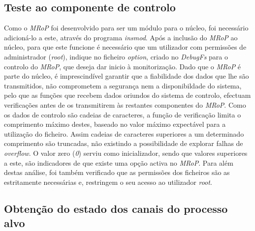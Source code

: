\subsection{Teste ao componente de controlo}

Como o \textit{MRoP} foi desenvolvido para ser um módulo para o núcleo, foi necessário adicioná-lo a este, através do programa \textit{insmod}.
Após a inclusão do \textit{MRoP} ao núcleo, para que este funcione é necessário que um utilizador com permissões de administrador (\textit{root}), indique no ficheiro \textit{option}, criado no \textit{DebugFs} para o controlo do \textit{MRoP}, que deseja dar inicio à monitorização.
Dado que o \textit{MRoP} é parte do núcleo, é imprescindível garantir que a fiabilidade dos dados que lhe são transmitidos, não comprometem a segurança nem a disponibildade do sistema, pelo que as funções que recebem dados oriundos do sistema de controlo, efectuam verificações antes de os transmitirem às restantes componentes do \textit{MRoP}.
Como os dados de controlo são cadeias de caracteres, a função de verificação limita o comprimento máximo destes, baseado no valor máximo expectável para a utilização do ficheiro.
Assim cadeias de caracteres superiores a um determinado comprimento são truncadas, não existindo a possibilidade de explorar falhas de \textit{overflow}.
O valor zero (\textit{0}) serviu como inicializador, sendo que valores superiores a este, são indicadores de que existe uma opção activa no \textit{MRoP}.
Para além destas análise, foi também verificado que as permissões dos ficheiros são as estritamente necessárias e, restringem o seu acesso ao utilizador \textit{root}.

\subsection{Obtenção do estado dos canais do processo alvo}

